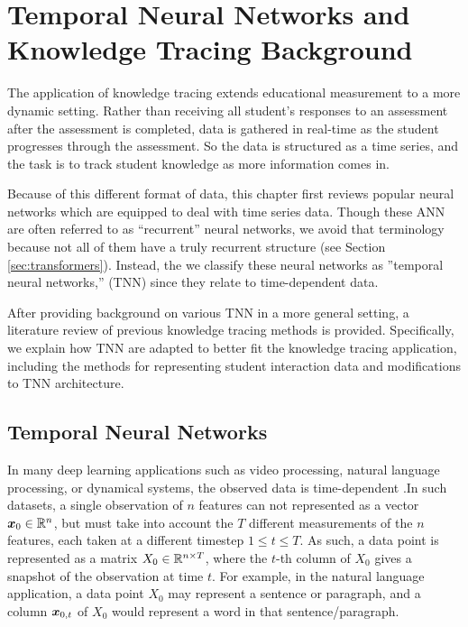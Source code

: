 \chapter{Temporal Neural Networks and Knowledge Tracing Background}
The application of knowledge tracing extends educational measurement to a more dynamic setting. Rather than receiving all student's responses to an assessment after the assessment is completed, data is gathered in real-time as the student progresses through the assessment. So the data is structured as a time series, and the task is to track student knowledge as more information comes in.

Because of this different format of data, this chapter first reviews popular neural networks which are equipped to deal with time series data. Though these ANN are often referred to as ``recurrent'' neural networks, we avoid that terminology because not all of them have a truly recurrent structure (see Section \ref{sec:transformers}). Instead, the we classify these neural networks as ''temporal neural networks,'' (TNN) since they relate to time-dependent data.

After providing background on various TNN in a more general setting, a literature review of previous knowledge tracing methods is provided. Specifically, we explain how TNN are adapted to better fit the knowledge tracing application, including the methods for representing student interaction data and modifications to TNN architecture.


\section*{Temporal Neural Networks}
In many deep learning applications such as video processing, natural language processing, or dynamical systems, the observed data is time-dependent \cite{kahou2015} \cite{vaswani2017} \cite{gilpin2020}.In such datasets, a single observation of $n$ features can not represented as a vector $\boldsymbol{x}_0 \in \mathbb{R}^n$, but must take into account the $T$ different measurements of the $n$ features, each taken at a different timestep $1 \leq t \leq T$. As such, a data point is represented as a matrix $X_0 \in \mathbb{R}^{n \times T}$, where the $t$-th column of $X_0$ gives a snapshot of the observation at time $t$. For example, in the natural language application, a data point $X_0$ may represent a sentence or paragraph, and a column $\boldsymbol{x}_{0,t}$ of $X_0$ would represent a word in that sentence/paragraph.

